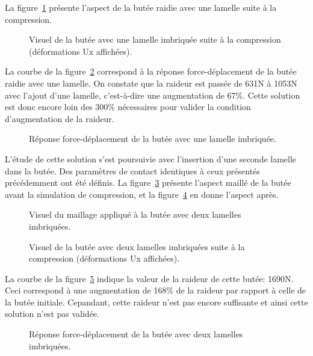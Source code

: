 ﻿\documentclass{article}
\begin{document}
La figure~\ref{fig8} présente l'aspect de la butée raidie avec une lamelle suite à la compression.

\begin{figure}[!h]
	\centering
	\caption{Visuel de la butée avec une lamelle imbriquée suite à la compression (déformations Ux affichées).}
	\label{fig8}
\end{figure}

La courbe de la figure~\ref{fig9} correspond à la réponse force-déplacement de la butée raidie avec une lamelle. On constate que la raideur est passée de 631N à 1053N avec l'ajout d'une lamelle, c'est-à-dire une augmentation de 67\%. Cette solution est donc encore loin des 300\% nécessaires pour valider la condition d'augmentation de la raideur.

\begin{figure}[!h]
	\centering
	\caption{Réponse force-déplacement de la butée avec une lamelle imbriquée.}
	\label{fig9}
\end{figure}

L'étude de cette solution s'est poursuivie avec l'insertion d'une seconde lamelle dans la butée. Des paramètres de contact identiques à ceux présentés précédemment ont été définis. La figure~\ref{fig10} présente l'aspect maillé de la butée avant la simulation de compression, et la figure~\ref{fig11} en donne l'aspect après.

\begin{figure}[!h]
	\centering
	\caption{Visuel du maillage appliqué à la butée avec deux lamelles imbriquées.}
	\label{fig10}
\end{figure}

\begin{figure}[!h]
	\centering
	\caption{Visuel de la butée avec deux lamelles imbriquées suite à la compression (déformations Ux affichées).}
	\label{fig11}
\end{figure}

La courbe de la figure~\ref{fig12} indique la valeur de la raideur de cette butée: 1690N. Ceci correspond à une augmentation de 168\% de la raideur par rapport à celle de la butée initiale. Cepandant, cette raideur n'est pas encore suffisante et ainsi cette solution n'est pas validée.
 
\begin{figure}[!h]
	\centering
	\caption{Réponse force-déplacement de la butée avec deux lamelles imbriquées.}
	\label{fig12}
\end{figure}
\end{document}
